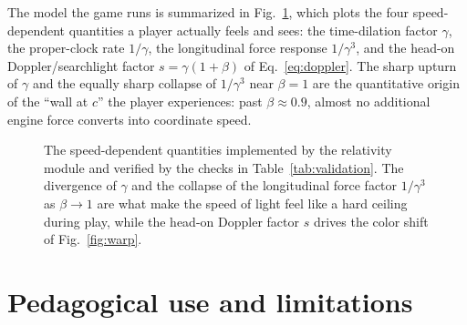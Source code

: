 \documentclass[aip,amsmath,amssymb,reprint,nofootinbib]{revtex4-2}
\begin{document}
The model the game runs is summarized in Fig.~\ref{fig:curves}, which plots the
four speed-dependent quantities a player actually feels and sees: the time-dilation
factor $\gamma$, the proper-clock rate $1/\gamma$, the longitudinal force response
$1/\gamma^3$, and the head-on Doppler/searchlight factor $s=\gamma(1+\beta)$ of
Eq.~\eqref{eq:doppler}. The sharp upturn of $\gamma$ and the equally sharp collapse
of $1/\gamma^3$ near $\beta=1$ are the quantitative origin of the ``wall at $c$''
the player experiences: past $\beta\approx0.9$, almost no additional engine force
converts into coordinate speed.

\begin{figure}[t]
\centering
{}
\caption{The speed-dependent quantities implemented by the relativity module and
verified by the checks in Table~\ref{tab:validation}. The divergence of $\gamma$
and the collapse of the longitudinal force factor $1/\gamma^3$ as $\beta\to1$ are
what make the speed of light feel like a hard ceiling during play, while the
head-on Doppler factor $s$ drives the color shift of Fig.~\ref{fig:warp}.}
\label{fig:curves}
\end{figure}

\section{Pedagogical use and limitations}\label{sec:pedagogy}
\end{document}
